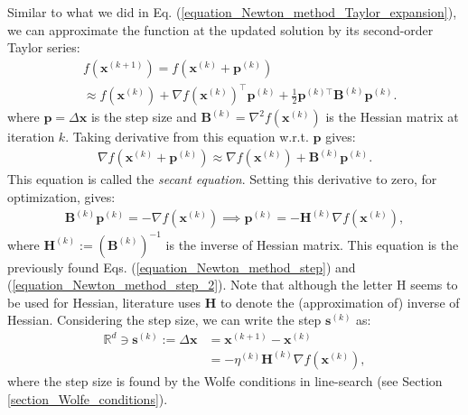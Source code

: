 \documentclass[lang=cn,10pt]{gorgeousnbook}
\numberwithin{equation}{section}%
\numberwithin{figure}{section}%
\begin{document}
Similar to what we did in Eq. (\ref{equation_Newton_method_Taylor_expansion}), we can approximate the function at the updated solution by its second-order Taylor series:
\begin{align*}
&f(\boldsymbol{x}^{(k+1)}) = f(\boldsymbol{x}^{(k)} + \boldsymbol{p}^{(k)}) \\
&\approx f(\boldsymbol{x}^{(k)}) + \nabla f(\boldsymbol{x}^{(k)})^\top \boldsymbol{p}^{(k)} + \frac{1}{2} \boldsymbol{p}^{(k)\top} \boldsymbol{B}^{(k)} \boldsymbol{p}^{(k)}. 
\end{align*}
where $\boldsymbol{p} = \Delta\boldsymbol{x}$ is the step size and $\boldsymbol{B}^{(k)} = \nabla^2 f(\boldsymbol{x}^{(k)})$ is the Hessian matrix at iteration $k$. 
Taking derivative from this equation w.r.t. $\boldsymbol{p}$ gives:
\begin{align}
\nabla f(\boldsymbol{x}^{(k)} + \boldsymbol{p}^{(k)}) \approx \nabla f(\boldsymbol{x}^{(k)}) + \boldsymbol{B}^{(k)} \boldsymbol{p}^{(k)}.
\end{align}
This equation is called the \textit{secant equation}. Setting this derivative to zero, for optimization, gives:
\begin{align}\label{equation_quasi_Newton_method_step}
\boldsymbol{B}^{(k)} \boldsymbol{p}^{(k)} = -\nabla f(\boldsymbol{x}^{(k)}) \implies \boldsymbol{p}^{(k)} = - \boldsymbol{H}^{(k)} \nabla f(\boldsymbol{x}^{(k)}), 
\end{align}
where $\boldsymbol{H}^{(k)} := (\boldsymbol{B}^{(k)})^{-1}$ is the inverse of Hessian matrix. 
This equation is the previously found Eqs. (\ref{equation_Newton_method_step}) and (\ref{equation_Newton_method_step_2}).
Note that although the letter H seems to be used for Hessian, literature uses $\boldsymbol{H}$ to denote the (approximation of) inverse of Hessian. 
Considering the step size, we can write the step $\boldsymbol{s}^{(k)}$ as:
\begin{equation}
\begin{aligned}
\mathbb{R}^d \ni \boldsymbol{s}^{(k)} := \Delta \boldsymbol{x} &= \boldsymbol{x}^{(k+1)} - \boldsymbol{x}^{(k)} \\
&= - \eta^{(k)} \boldsymbol{H}^{(k)} \nabla f(\boldsymbol{x}^{(k)}),
\end{aligned}
\end{equation}
where the step size is found by the Wolfe conditions in line-search (see Section \ref{section_Wolfe_conditions}).
\end{document}
